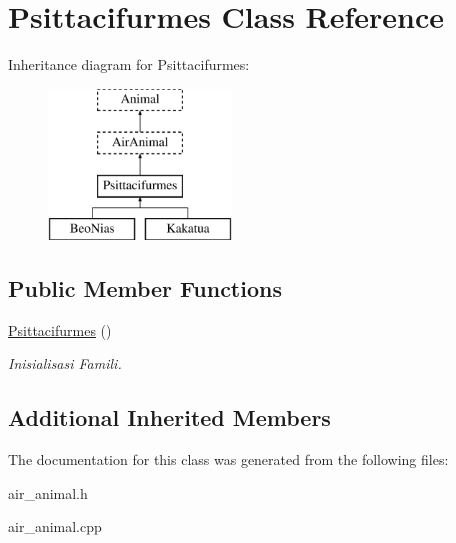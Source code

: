 \hypertarget{class_psittacifurmes}{}\section{Psittacifurmes Class Reference}
\label{class_psittacifurmes}
Inheritance diagram for Psittacifurmes\+:\begin{figure}[H]
\begin{center}
\leavevmode
\includegraphics[height=4.000000cm]{class_psittacifurmes}
\end{center}
\end{figure}
\subsection*{Public Member Functions}
\begin{DoxyCompactItemize}
\item 
\hyperlink{class_psittacifurmes_a39b423cfbbf129d845594ae45b942d5e}{Psittacifurmes} ()\hypertarget{class_psittacifurmes_a39b423cfbbf129d845594ae45b942d5e}{}\label{class_psittacifurmes_a39b423cfbbf129d845594ae45b942d5e}

\begin{DoxyCompactList}\small\item\em Inisialisasi Famili. \end{DoxyCompactList}\end{DoxyCompactItemize}
\subsection*{Additional Inherited Members}


The documentation for this class was generated from the following files\+:\begin{DoxyCompactItemize}
\item 
air\+\_\+animal.\+h\item 
air\+\_\+animal.\+cpp\end{DoxyCompactItemize}
